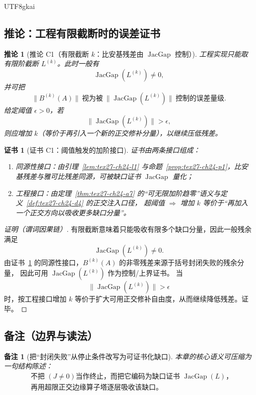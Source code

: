 \documentclass[12pt]{article}
\newtheorem{corollary}{推论}[section]
\newtheorem{remark}{备注}[section]
\newtheorem{Certificate}{证书}[section]
\newcommand{\JacGap}{\operatorname{JacGap}}
\begin{document}
\begin{CJK*}{UTF8}{gkai}
\subsection{推论：工程有限截断时的误差证书}
\label{subsec:tex27-ch24-cor}

\begin{corollary}[推论 C1（有限截断 $k$：比安基残差由 $\JacGap$ 控制）]
\label{cor:tex27-ch24-c1}
工程实现只能取有限阶截断 $L^{(k)}$。此时一般有
\[
  \JacGap(L^{(k)})\neq 0,
\]
并可把
\[
  \|B^{(k)}(A)\|
  \ \text{视为被}\
  \|\JacGap(L^{(k)})\|\ \text{控制的误差量级}.
\]
给定阈值 $\epsilon>0$，若
\[
  \|\JacGap(L^{(k)})\|>\epsilon,
\]
则应增加 $k$（等价于再引入一个新的正交修补分量），以继续压低残差。
\end{corollary}

\begin{Certificate}[证书 C1：阈值触发的加阶接口]
\label{cert:tex27-ch24-c1}
证书由两条接口组成：
\begin{enumerate}
  \item 同源性接口：由引理~\ref{lem:tex27-ch24-l1} 与命题~\ref{prop:tex27-ch24-p1}，比安基残差与雅可比残差同源，可被缺口证书 $\JacGap$ 量化；
  \item 工程接口：由定理~\ref{thm:tex27-ch24-a7} 的“可无限加阶趋零”语义与定义~\ref{def:tex27-ch24-d4} 的正交注入口径，
  超阈值 $\Rightarrow$ 增加 $k$ 等价于“再加入一个正交方向以吸收更多缺口分量”。
\end{enumerate}
\end{Certificate}

\begin{proof}[证明（谓词因果链）]
有限截断意味着只能吸收有限多个缺口分量，因此一般残余满足
\[
  \JacGap(L^{(k)})\neq 0.
\]
由证书~\ref{cert:tex27-ch24-c1} 的同源性接口，$B^{(k)}(A)$ 的非零残差来源于括号封闭失败的残余分量，
因此可用 $\JacGap(L^{(k)})$ 作为控制/上界证书。
当
\[
  \|\JacGap(L^{(k)})\|>\epsilon
\]
时，按工程接口增加 $k$ 等价于扩大可用正交修补自由度，从而继续降低残差。证毕。
\end{proof}

\subsection{备注（边界与读法）}
\label{subsec:tex27-ch24-remarks}

\begin{remark}[把“封闭失败”从停止条件改写为可证书化缺口]
本章的核心语义可压缩为一句结构陈述：
\[
  \boxed{
  \begin{aligned}
    &\text{不把 }(J\neq 0)\text{当作终止，而把它编码为缺口证书 }\JacGap(L)，\\
    &\text{再用超限正交边缘算子塔逐层吸收该缺口。}
  \end{aligned}
  }
\]
\end{remark}


\end{CJK*}
\end{document}
